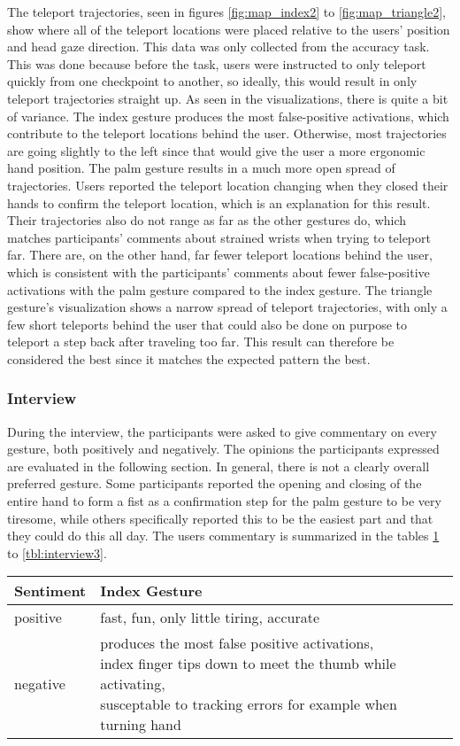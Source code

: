 The teleport trajectories, seen in figures \ref{fig:map_index2} to \ref{fig:map_triangle2}, show where all of the teleport locations were placed relative to the users' position and head gaze direction. This data was only collected from the accuracy task. This was done because before the task, users were instructed to only teleport quickly from one checkpoint to another, so ideally, this would result in only teleport trajectories straight up. As seen in the visualizations, there is quite a bit of variance. The index gesture produces the most false-positive activations, which contribute to the teleport locations behind the user. Otherwise, most trajectories are going slightly to the left since that would give the user a more ergonomic hand position. The palm gesture results in a much more open spread of trajectories. Users reported the teleport location changing when they closed their hands to confirm the teleport location, which is an explanation for this result. Their trajectories also do not range as far as the other gestures do, which matches participants' comments about strained wrists when trying to teleport far. There are, on the other hand, far fewer teleport locations behind the user, which is consistent with the participants' comments about fewer false-positive activations with the palm gesture compared to the index gesture. The triangle gesture's visualization shows a narrow spread of teleport trajectories, with only a few short teleports behind the user that could also be done on purpose to teleport a step back after traveling too far. This result can therefore be considered the best since it matches the expected pattern the best. 

\subsubsection{Interview}
During the interview, the participants were asked to give commentary on every gesture, both positively and negatively. The opinions the participants expressed are evaluated in the following section. In general, there is not a clearly overall preferred gesture. Some participants reported the opening and closing of the entire hand to form a fist as a confirmation step for the palm gesture to be very tiresome, while others specifically reported this to be the easiest part and that they could do this all day. The users commentary is summarized in the tables \ref{tbl:interview1} to \ref{tbl:interview3}. 

\begin{table}[]
\centering
\begin{tabular}{llll}
\hline
Sentiment &
    Index Gesture \\ \hline
positive &
    fast, fun, only little tiring, accurate  \\ \hline
negative &
    \makecell{produces the most false positive activations, \\index finger tips down to meet the thumb while activating, \\susceptable to tracking errors for example when turning hand} \\ \hline
\end{tabular}
\label{tbl:interview1}
\end{table}

